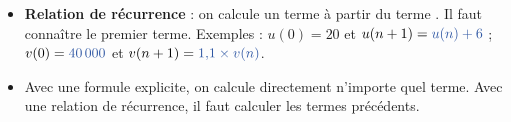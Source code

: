 \documentclass[12pt,a4paper]{article}
\begin{document}
\begin{bilan}
\begin{itemize}[leftmargin=1.2em]
\item \textbf{Relation de récurrence} : on calcule un terme à partir du terme . Il faut connaître le premier terme. Exemples : $u(0) = 20$ et $u(n+1) = \rep{$u(n) + 6$}$ ; $v(0) = \rep{$40\,000$}$ et $v(n+1) = \rep{$1{,}1 \times v(n)$}$.
\item Avec une formule explicite, on calcule directement n'importe quel terme. Avec une relation de récurrence, il faut calculer  les termes précédents.
\end{itemize}
\end{bilan}
\end{document}
